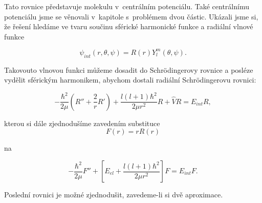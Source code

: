 Tato rovnice představuje molekulu v~centrálním potenciálu. Také centrálnímu potenciálu jsme se věnovali v~kapitole s~problémem dvou částic. Ukázali jsme si, že řešení hledáme ve tvaru součinu sférické harmonické funkce a radiální vlnové funkce

\begin{equation}
\psi_{int}(r,\theta,\psi)=R(r)Y^m_l(\theta,\psi).
\end{equation}

\noindent Takovouto vlnovou funkci můžeme dosadit do Schr\"odingerovy rovnice a posléze vydělit sférickým harmonikem, abychom dostali radiální Schr\"odingerovu rovnici:

\begin{equation}
-\frac{\hbar^2}{2\mu}\left(R''+\frac{2}{r}R'\right)+\frac{l\left(l+1\right)\hbar^2}{2\mu r^2}R+\hat{V}R=E_{int}R,
\end{equation}

\noindent kterou si dále zjednodušíme zavedením substituce
\begin{displaymath}
F(r)=rR(r)
\end{displaymath}

\noindent na

\begin{equation}
-\frac{\hbar^2}{2\mu}F''+\left[E_{el}+\frac{l\left(l+1\right)\hbar^2}{2\mu r^2}\right]F=E_{int}F.
\label{vibrot:vibrot3}
\end{equation}

\noindent Poslední rovnici je možné zjednodušit, zavedeme-li si dvě aproximace. 

